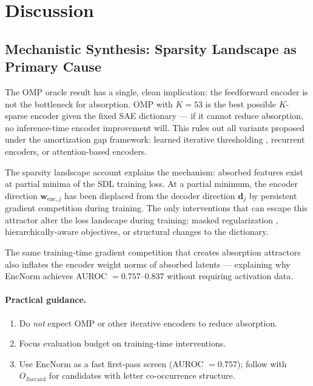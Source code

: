 \documentclass{article}
\begin{document}
\section{Discussion}
\label{sec:discussion}

\subsection{Mechanistic Synthesis: Sparsity Landscape as Primary Cause}

The OMP oracle result has a single, clean implication: the feedforward encoder is not the
bottleneck for absorption. OMP with $K=53$ is the best possible $K$-sparse encoder given the
fixed SAE dictionary --- if it cannot reduce absorption, no inference-time encoder improvement
will. This rules out all variants proposed under the amortization gap framework: learned
iterative thresholding \citep{oneill2024amortization}, recurrent encoders, or
attention-based encoders.

The sparsity landscape account \citep{tang2024unified} explains the mechanism: absorbed
features exist at partial minima of the SDL training loss. At a partial minimum, the encoder
direction $\mathbf{w}_{\mathrm{enc},j}$ has been displaced from the decoder direction
$\mathbf{d}_j$ by persistent gradient competition during training. The only interventions
that can escape this attractor alter the loss landscape during training: masked regularization
\citep{narayanaswamy2026masked}, hierarchically-aware objectives, or structural changes to
the dictionary.

The same training-time gradient competition that creates absorption attractors also inflates
the encoder weight norms of absorbed latents --- explaining why EncNorm achieves
AUROC $= 0.757$--$0.837$ without requiring activation data.

\paragraph{Practical guidance.}
\begin{enumerate}
  \item Do \emph{not} expect OMP or other iterative encoders to reduce absorption.
  \item Focus evaluation budget on training-time interventions.
  \item Use EncNorm as a fast first-pass screen (AUROC $= 0.757$); follow with
    $O_\mathrm{Jaccard}$ for candidates with letter co-occurrence structure.
\end{enumerate}
\end{document}
